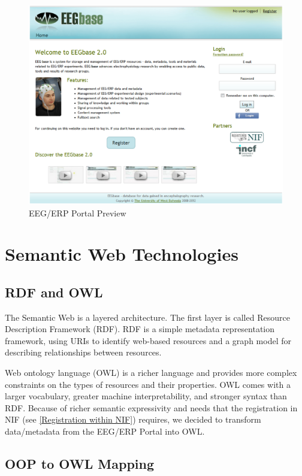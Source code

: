 \documentclass[conference]{IEEEtran}
\begin{document}
\begin{figure}[h]
	\centering
\includegraphics[scale=0.24]{eeg_erp_portal_preview}

\caption{\label{fig:EEG/ERP Portal Preview}EEG/ERP Portal Preview}

\end{figure}


\section{Semantic Web Technologies}

\subsection{RDF and OWL}

The Semantic Web is a layered architecture. The first layer is called Resource Description Framework (RDF). RDF is a simple metadata representation framework, using URIs to identify web-based resources and a graph model for describing relationships between resources.

Web ontology language (OWL) is a richer language and provides more complex constraints on the types of resources and their properties. OWL comes with a larger vocabulary, greater machine interpretability, and stronger syntax than RDF. Because of  richer semantic expressivity and needs that the registration in NIF (see \ref{Registration within NIF}) requires, we decided to transform data/metadata from the EEG/ERP Portal into OWL.

\subsection{OOP to OWL Mapping}
\end{document}
